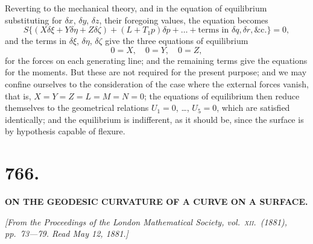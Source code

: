 \documentclass[11pt,a4paper,english]{article}
\theoremstyle{plain}
\begin{document}
Reverting to the mechanical theory, and in the equation of equilibrium substituting for $\delta x$, $\delta y$, $\delta z$, their foregoing values, the equation becomes
\[
S\{(X\delta\xi + Y\delta\eta + Z\delta\zeta) + (L + T_1 p)\delta p + \ldots + \text{terms in } \delta q, \delta r, \&\text{c.}\} = 0,
\]
and the terms in $\delta\xi$, $\delta\eta$, $\delta\zeta$ give the three equations of equilibrium
\[
0 = X,\quad 0 = Y,\quad 0 = Z,
\]
for the forces on each generating line; and the remaining terms give the equations for the moments. But these are not required for the present purpose; and we may confine ourselves to the consideration of the case where the external forces vanish, that is, $X = Y = Z = L = M = N = 0$; the equations of equilibrium then reduce themselves to the geometrical relations $U_1 = 0$, \ldots, $U_5 = 0$, which are satisfied identically; and the equilibrium is indifferent, as it should be, since the surface is by hypothesis capable of flexure.

\newpage

\section*{766.}

\begin{center}
\textbf{ON THE GEODESIC CURVATURE OF A CURVE ON A SURFACE.}
\end{center}

\noindent\textit{[From the \textit{Proceedings of the London Mathematical Society}, vol.\ \textsc{xii}.\ (1881), pp.\ 73---79. Read May 12, 1881.]}

\vspace{\baselineskip}
\end{document}
